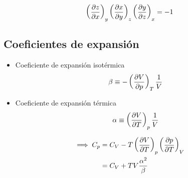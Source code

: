 \[\devtermo{y}{z}{x}\devtermo{z}{x}{y}\devtermo{x}{y}{z} = -1\]

\subsection{Coeficientes de expansión}

\begin{itemize}
    \item Coeficiente de expansión isotérmica
    \[ \beta \equiv -\devtermo{T}{V}{p}\frac{1}{V} \]
    
    \item Coeficiente de expansión térmica
    \[ \alpha \equiv \devtermo{p}{V}{T}\frac{1}{V} \]
\end{itemize}

\begin{equation}
\begin{split}
    \implies C_p &= C_V - T\devtermo{p}{V}{T}\devtermo{V}{p}{T}\\
                 &= C_V + TV\frac{\alpha^2}{\beta} 
\end{split}
\nonumber
\end{equation}